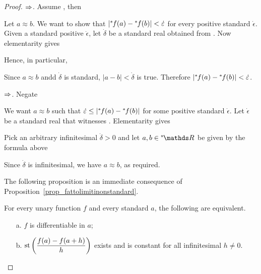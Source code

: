 \begin{proof}
$\Rightarrow$.
Assume , then


Let $a\approx b$.
We want to show that $|{}^*\kern-.2ex f(a)-{}^*\kern-.2ex f(b)|<\dot{\varepsilon}$ for every positive standard $\dot\epsilon$.
Given a standard positive $\dot\epsilon$, let $\dot\delta$ be a standard real obtained from .
Now elementarity gives


Hence, in particular,

\ceq{\hfill\ns\RR}{\models}{\phantom{\A\,\epsilon>0\ \E\,\delta>0\ \A x, y\ \Big[}|a-b|<\dot\delta\ \ \imp\ \ |fa-fb|<\dot\epsilon.}

Since $a\approx b$ andd $\dot\delta$ is standard, $|a-b|<\dot\delta$ is true.
Therefore $|{}^*\kern-.2ex f(a)-{}^*\kern-.2ex f(b)|<\dot{\varepsilon}$.

$\Rightarrow$.
Negate 


We want  $a\approx b$ such that $\dot{\varepsilon}\le|{}^*\kern-.2ex f(a)-{}^*\kern-.2ex f(b)|$ for some positive standard $\dot\epsilon$.
Let $\dot\epsilon$ be a standard real that witnesses .
Elementarity gives


Pick an arbitrary infinitesimal $\dot\delta>0$ and let $a,b\in\nsR$ be given by the formula above

\ceq{\hfill\ns\RR}{\models}{\phantom{\E\,\epsilon>0\ \A\,\delta>0\ \E x, y\ \Big[}|a-b|<\delta\ \ \wedge\ \ \dot\epsilon\le|fa-fb|.}

Since $\dot\delta$ is infinitesimal, we have $a\approx b$, as required.

The following proposition is an immediate consequence of Proposition~\ref{prop_fattolimitinonstandard}.

\begin{proposition}
For every unary function $f$ and every standard $a$, the following are equivalent.
\begin{itemize}
\item[a.] $f$ is differentiable in $a$;
\item[b.] ${\rm st}\left(\displaystyle\frac{f(a)-f(a+h)}{h}\right)$ exists and is constant for all infinitesimal $h\neq0$.
\end{itemize}
\end{proposition}



\end{proof}
